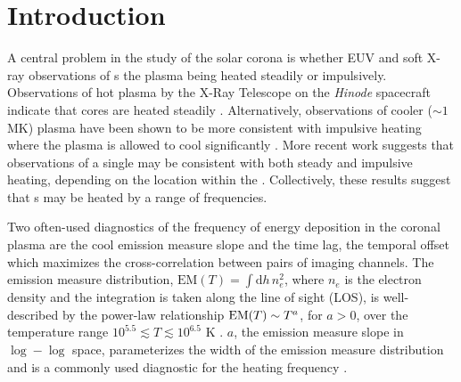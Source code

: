 \section{Introduction}\label{sec:introduction}

A central problem in the study of the solar corona is whether EUV and soft X-ray observations of \AR s  the plasma being heated steadily or impulsively.
Observations of hot plasma by the X-Ray Telescope \citep[XRT,][]{golub_x-ray_2007} on the \textit{Hinode} spacecraft \citep{kosugi_hinode_2007} indicate that \AR{} cores are heated steadily \citep[e.g.][]{warren_constraints_2011,winebarger_using_2011}.
Alternatively, observations of cooler ($\sim1$ MK) plasma have been shown to be more consistent with impulsive heating where the plasma is allowed to cool significantly  \citep[e.g][]{winebarger_evolving_2003,mulu-moore_determining_2011,ugarte-urra_investigation_2006,viall_patterns_2011,viall_evidence_2012}.
More recent work \citep{del_zanna_evolution_2015,bradshaw_patterns_2016} suggests that observations of a single \AR{} may be consistent with both steady and impulsive heating, depending on the location within the \AR{}.
Collectively, these results suggest that \AR s may be heated by a range of frequencies.

Two often-used diagnostics of the frequency of energy deposition in the coronal plasma are the cool emission measure slope and the time lag, the temporal offset which maximizes the cross-correlation between pairs of imaging channels.
The emission measure distribution, $\mathrm{EM}(T)=\int\mathrm{d}h\,n_e^2$, where $n_e$ is the electron density and the integration is taken along the line of sight (LOS), is well-described by the power-law relationship $\textup{EM}(T)\sim T^a$, for $a>0$, over the temperature range $10^{5.5}\lesssim T\lesssim10^{6.5}$ K \citep{jordan_structure_1975,jordan_structure_1976}.
$a$, the emission measure slope in $\log-\log$ space, parameterizes the width of the emission measure distribution and is a commonly used diagnostic for the heating frequency \citep[e.g.][]{tripathi_emission_2011,winebarger_using_2011,warren_constraints_2011,mulu-moore_can_2011,bradshaw_diagnosing_2012,schmelz_cold_2012,reep_diagnosing_2013,del_zanna_evolution_2015}.

